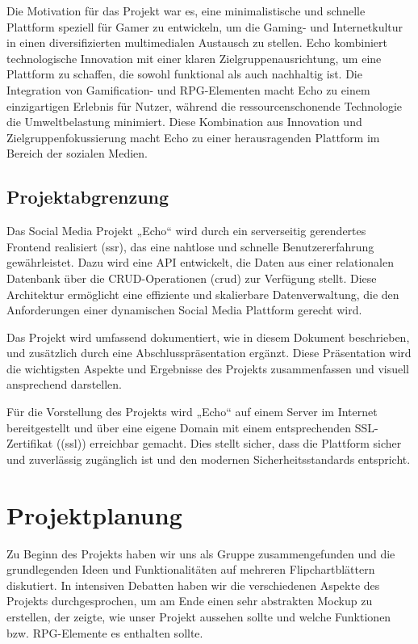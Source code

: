 \documentclass[a4paper,12pt]{article}
\begin{document}
Die Motivation für das Projekt war es, eine minimalistische und schnelle Plattform speziell für Gamer zu entwickeln, um die Gaming- und Internetkultur in einen diversifizierten multimedialen Austausch zu stellen. Echo kombiniert technologische Innovation mit einer klaren Zielgruppenausrichtung, um eine Plattform zu schaffen, die sowohl funktional als auch nachhaltig ist. Die Integration von Gamification- und RPG-Elementen macht Echo zu einem einzigartigen Erlebnis für Nutzer, während die ressourcenschonende Technologie die Umweltbelastung minimiert. Diese Kombination aus Innovation und Zielgruppenfokussierung macht Echo zu einer herausragenden Plattform im Bereich der sozialen Medien.

\subsection{Projektabgrenzung}
Das Social Media Projekt „Echo“ wird durch ein serverseitig gerendertes Frontend realisiert (\gls{ssr}), das eine nahtlose und schnelle Benutzererfahrung gewährleistet. Dazu wird eine API entwickelt, die Daten aus einer relationalen Datenbank über die CRUD-Operationen (\gls{crud}) zur Verfügung stellt. Diese Architektur ermöglicht eine effiziente und skalierbare Datenverwaltung, die den Anforderungen einer dynamischen Social Media Plattform gerecht wird.

Das Projekt wird umfassend dokumentiert, wie in diesem Dokument beschrieben, und zusätzlich durch eine Abschlusspräsentation ergänzt. Diese Präsentation wird die wichtigsten Aspekte und Ergebnisse des Projekts zusammenfassen und visuell ansprechend darstellen.

Für die Vorstellung des Projekts wird „Echo“ auf einem Server im Internet bereitgestellt und über eine eigene Domain mit einem entsprechenden SSL-Zertifikat ((\gls{ssl})) erreichbar gemacht. Dies stellt sicher, dass die Plattform sicher und zuverlässig zugänglich ist und den modernen Sicherheitsstandards entspricht.

\newpage
\section{Projektplanung}

Zu Beginn des Projekts haben wir uns als Gruppe zusammengefunden und die grundlegenden Ideen und Funktionalitäten auf mehreren Flipchartblättern diskutiert. In intensiven Debatten haben wir die verschiedenen Aspekte des Projekts durchgesprochen, um am Ende einen sehr abstrakten Mockup zu erstellen, der zeigte, wie unser Projekt aussehen sollte und welche Funktionen bzw. RPG-Elemente es enthalten sollte.
\end{document}
